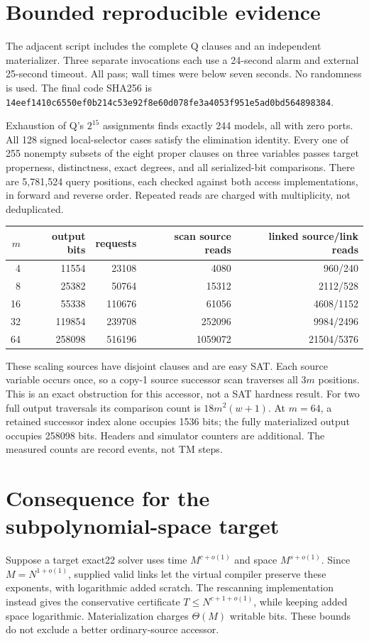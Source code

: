 \documentclass[11pt]{article}
\begin{document}
\section{Bounded reproducible evidence}
The adjacent script includes the complete Q clauses and an independent
materializer. Three separate invocations each use a 24-second alarm and
external 25-second timeout. All pass; wall times were below seven seconds.
No randomness is used. The final code SHA256 is
\texttt{14eef1410c6550ef0b214c53e92f8e60d078fe3a4053f951e5ad0bd564898384}.

Exhaustion of Q's $2^{15}$ assignments finds exactly 244 models, all with
zero ports. All 128 signed local-selector cases satisfy the elimination identity.
Every one of 255 nonempty subsets of the eight proper clauses on three
variables passes target properness, distinctness, exact degrees, and all
serialized-bit comparisons. There are 5,781,524 query positions,
each checked against both access implementations, in forward and reverse
order. Repeated reads are charged with multiplicity, not deduplicated.

\begin{center}\begin{tabular}{rrrrr}\toprule
$m$&output bits&requests&scan source reads&linked source/link reads\\\midrule
4&11554&23108&4080&960/240\\
8&25382&50764&15312&2112/528\\
16&55338&110676&61056&4608/1152\\
32&119854&239708&252096&9984/2496\\
64&258098&516196&1059072&21504/5376\\\bottomrule
\end{tabular}\end{center}
These scaling sources have disjoint clauses and are easy SAT.
Each source variable occurs once, so a copy-1 source successor scan traverses
all $3m$ positions. This is an exact obstruction for this accessor, not a
SAT hardness result. For two full output traversals its comparison count is
$18m^2(w+1)$. At $m=64$, a retained successor index alone occupies 1536 bits;
the fully materialized output occupies 258098 bits. Headers and simulator
counters are additional. The measured counts are record events, not TM steps.

\section{Consequence for the subpolynomial-space target}
Suppose a target exact22 solver uses time $M^{c+o(1)}$ and
space $M^{s+o(1)}$. Since $M=N^{1+o(1)}$, supplied valid links let the
virtual compiler preserve these exponents, with logarithmic added scratch.
The rescanning implementation instead gives the conservative certificate
$T\le N^{c+1+o(1)}$, while keeping added space logarithmic.
Materialization charges $\Theta(M)$ writable bits.
These bounds do not exclude a better ordinary-source accessor.
\end{document}
